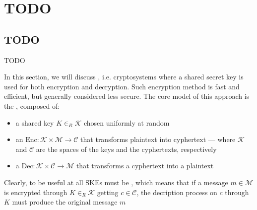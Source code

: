 \documentclass[a4paper, 12pt]{report}
\institute{\curlyquotes{\hspace{0.25mm}Sapienza} Università di Roma}
\subtitle{Appunti integrati con il libro \book}
\author{\textit{Autore}\\\authorName}
\institute{\curlyquotes{\hspace{0.25mm}Sapienza} University of Rome}
\subtitle{Lecture notes integrated with the book \book}
\author{\textit{Author}\\\authorName}
\title{\courseName}
\date{\today}
\begin{document}
\maketitle

{
	\hypersetup{allcolors=black}

	\romantableofcontents
}

\introduction


\chapter{TODO}

\section{TODO}

TODO 

In this section, we will discuss , i.e. cryptosystems where a shared secret key is used for both encryption and decryption. Such encryption method is fast and efficient, but generally considered less secure. The core model of this approach is the , composed of:

\begin{itemize}
	\item a shared  key $K \in_R \mathcal K$ chosen uniformly at random
	\item an  $\mbox{Enc} : \mathcal K \times \mathcal M \to \mathcal C$ that transforms plaintext into cyphertext --- where $\mathcal K$ and $\mathcal C$ are the spaces of the keys and the cyphertexts, respectively
	\item a  $\mbox{Dec}: \mathcal K \times \mathcal C \to \mathcal M$ that transforms a cyphertext into a plaintext
\end{itemize}

Clearly, to be useful at all SKEs must be , which means that if a message $m \in \mathcal M$ is encrypted through $K \in_R \mathcal K$ getting $c \in \mathcal C$, the decription process on $c$ through $K$ must produce the original message $m$
\end{document}
